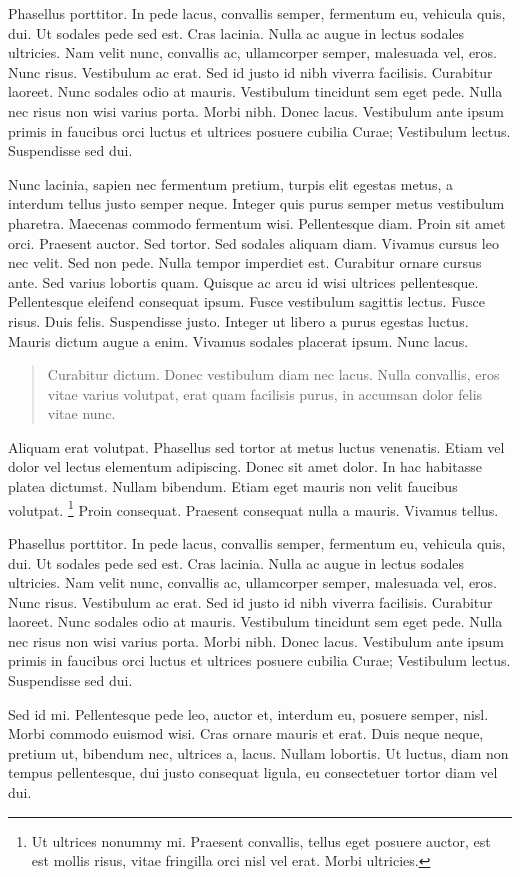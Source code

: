 Phasellus porttitor. In pede lacus, convallis semper, fermentum eu,
vehicula quis, dui. Ut sodales pede sed est. Cras lacinia. Nulla ac augue
in lectus sodales ultricies. Nam velit nunc, convallis ac, ullamcorper
semper, malesuada vel, eros. Nunc risus. Vestibulum ac erat. Sed id justo
id nibh viverra facilisis. Curabitur laoreet. Nunc sodales odio at mauris.
Vestibulum tincidunt sem eget pede. Nulla nec risus non wisi varius porta.
Morbi nibh. Donec lacus. Vestibulum ante ipsum primis in faucibus orci
luctus et ultrices posuere cubilia Curae; Vestibulum lectus. Suspendisse
sed dui. 

Nunc lacinia, sapien nec fermentum pretium, turpis elit egestas metus, a
interdum tellus justo semper neque. Integer quis purus semper metus
vestibulum pharetra. Maecenas commodo fermentum wisi. Pellentesque diam.
Proin sit amet orci. Praesent auctor. Sed tortor. Sed sodales aliquam diam.
Vivamus cursus leo nec velit. Sed non pede. Nulla tempor imperdiet est.
Curabitur ornare cursus ante. Sed varius lobortis quam. Quisque ac arcu id
wisi ultrices pellentesque. Pellentesque eleifend consequat ipsum. Fusce
vestibulum sagittis lectus. Fusce risus. Duis felis. Suspendisse justo.
Integer ut libero a purus egestas luctus. Mauris dictum augue a enim.
Vivamus sodales placerat ipsum. Nunc lacus. 

\begin{quote}
Curabitur dictum. Donec vestibulum diam nec lacus. Nulla convallis, eros
vitae varius volutpat, erat quam facilisis purus, in accumsan dolor felis
vitae nunc. 
\end{quote}

Aliquam erat volutpat. Phasellus sed tortor at metus luctus venenatis.
Etiam vel dolor vel lectus elementum adipiscing. Donec sit amet dolor. In
hac habitasse platea dictumst. Nullam bibendum. Etiam eget mauris non velit
faucibus volutpat. \footnote{Ut ultrices nonummy mi. Praesent convallis, tellus eget
posuere auctor, est est mollis risus, vitae fringilla orci nisl vel erat.
Morbi ultricies.} Proin consequat. Praesent consequat nulla a mauris.
Vivamus tellus. 

Phasellus porttitor. In pede lacus, convallis semper, fermentum eu,
vehicula quis, dui. Ut sodales pede sed est. Cras lacinia. Nulla ac augue
in lectus sodales ultricies. Nam velit nunc, convallis ac, ullamcorper
semper, malesuada vel, eros. Nunc risus. Vestibulum ac erat. Sed id justo
id nibh viverra facilisis. Curabitur laoreet. Nunc sodales odio at mauris.
Vestibulum tincidunt sem eget pede. Nulla nec risus non wisi varius porta.
Morbi nibh. Donec lacus. Vestibulum ante ipsum primis in faucibus orci
luctus et ultrices posuere cubilia Curae; Vestibulum lectus. Suspendisse
sed dui. 

Sed id mi. Pellentesque pede leo, auctor et, interdum eu, posuere semper,
nisl. Morbi commodo euismod wisi. Cras ornare mauris et erat. Duis neque
neque, pretium ut, bibendum nec, ultrices a, lacus. Nullam lobortis. Ut
luctus, diam non tempus pellentesque, dui justo consequat ligula, eu
consectetuer tortor diam vel dui. 

